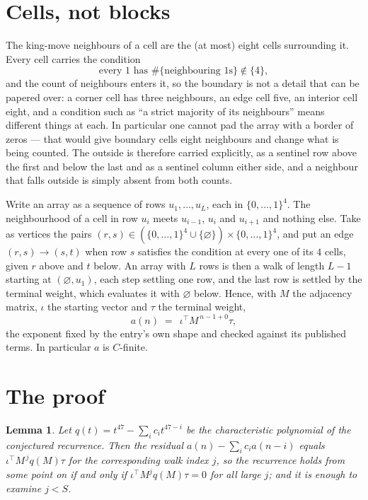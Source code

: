\documentclass[11pt,a4paper]{article}
\theoremstyle{plain}
\newtheorem{lemma}[theorem]{Lemma}
\theoremstyle{definition}
\begin{document}
\section{Cells, not blocks}

The king-move neighbours of a cell are the (at most) eight cells surrounding it. Every cell
carries the condition
\[
\text{every }1\text{ has }\#\{\text{neighbouring }1\text{s}\}\notin\{4\},
\]
and the count of neighbours enters it, so the boundary is not a detail that can be papered
over: a corner cell has three neighbours, an edge cell five, an interior cell eight, and a
condition such as ``a strict majority of its neighbours'' means different things at each. In
particular one cannot pad the array with a border of zeros --- that would give boundary cells
eight neighbours and change what is being counted. The outside is therefore carried
explicitly, as a sentinel row above the first and below the last and as a sentinel column
either side, and a neighbour that falls outside is simply absent from both counts.

Write an array as a sequence of rows $u_1,\dots,u_L$, each in
$\{0,\dots,1\}^{4}$. The neighbourhood of a cell in row $u_i$ meets $u_{i-1}$,
$u_i$ and $u_{i+1}$ and nothing else. Take as vertices the pairs
$(r,s)\in(\{0,\dots,1\}^{4}\cup\{\varnothing\})\times\{0,\dots,1\}^{4}$,
and put an edge $(r,s)\to(s,t)$ when row $s$ satisfies the condition at every one of its
$4$ cells, given $r$ above and $t$ below. An array with $L$ rows is then a walk of length
$L-1$ starting at $(\varnothing,u_1)$, each step settling one row, and the last row is
settled by the terminal weight, which evaluates it with $\varnothing$ below. Hence,
with $M$ the adjacency matrix, $\iota$ the starting vector and $\tau$ the terminal weight,
\[
a(n)\;=\;\,\iota^{\!\top}M^{\,n-1+0}\tau ,
\]
the exponent fixed by the entry's own shape and checked against its published terms. In
particular $a$ is $C$-finite.

\section{The proof}

\begin{lemma}\label{lem:crit}
Let $q(t)=t^{47}-\sum_i c_it^{47-i}$ be the characteristic polynomial of the
conjectured recurrence. Then the residual $a(n)-\sum_ic_ia(n-i)$ equals
$\iota^{\!\top}M^{\,j}q(M)\tau$ for the corresponding walk index $j$, so the
recurrence holds from some point on if and only if $\iota^{\!\top}M^{j}q(M)\tau=0$ for all
large $j$; and it is enough to examine $j<S$.
\end{lemma}
\end{document}
